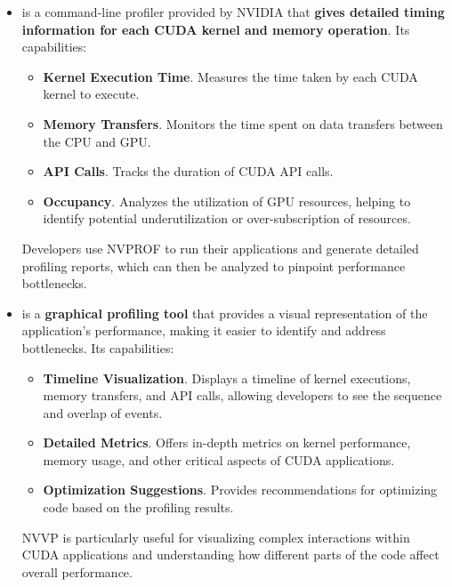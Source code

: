\begin{itemize}
    \item {} is a command-line profiler provided by NVIDIA that \textbf{gives detailed timing information for each CUDA kernel and memory operation}. Its capabilities:
    \begin{itemize}
        \item \textbf{Kernel Execution Time}. Measures the time taken by each CUDA kernel to execute.
        \item \textbf{Memory Transfers}. Monitors the time spent on data transfers between the CPU and GPU.
        \item \textbf{API Calls}. Tracks the duration of CUDA API calls.
        \item \textbf{Occupancy}. Analyzes the utilization of GPU resources, helping to identify potential underutilization or over-subscription of resources.
    \end{itemize}
    Developers use NVPROF to run their applications and generate detailed profiling reports, which can then be analyzed to pinpoint performance bottlenecks.

    \item {} is a \textbf{graphical profiling tool} that provides a visual representation of the application's performance, making it easier to identify and address bottlenecks. Its capabilities:
    \begin{itemize}
        \item \textbf{Timeline Visualization}. Displays a timeline of kernel executions, memory transfers, and API calls, allowing developers to see the sequence and overlap of events.
        \item \textbf{Detailed Metrics}. Offers in-depth metrics on kernel performance, memory usage, and other critical aspects of CUDA applications.
        \item \textbf{Optimization Suggestions}. Provides recommendations for optimizing code based on the profiling results.
    \end{itemize}
    NVVP is particularly useful for visualizing complex interactions within CUDA applications and understanding how different parts of the code affect overall performance.


\end{itemize}
